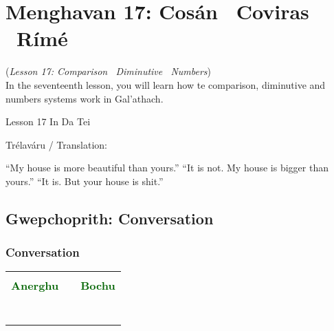 \section{Menghavan 17: Cos\'{a}n \textendash\ Coviras \textendash\ R\'{i}m\'{e}}
(\textit{Lesson 17: Comparison \textendash\ Diminutive \textendash\ Numbers})\\

In the seventeenth lesson, you will learn how te comparison, diminutive and numbers systems work in Gal'{a}thach. 

Lesson 17 In Da Tei

Tr\'{e}lav\'{a}ru / Translation:

``My house is more beautiful than yours.''
``It is not. My house is bigger than yours.''
``It is. But your house is shit.''

\subsection{Gwepchoprith: Conversation}
\subsubsection{Conversation}

\begin{table}[H]
\centering
    \begin{tabular}{M{3.0cm}M{10.0cm}M{3.0cm}}
     &  & \\
    \textcolor{darkgreen}{\textbf{Anerghu}} &  & \textcolor{darkgreen}{\textbf{Bochu}}\\
     &  & \\
     &  & \\
     &  & \\
     &  & \\
     &  & \\
     &  & \\
     &  & 
    \end{tabular}
\end{table}

